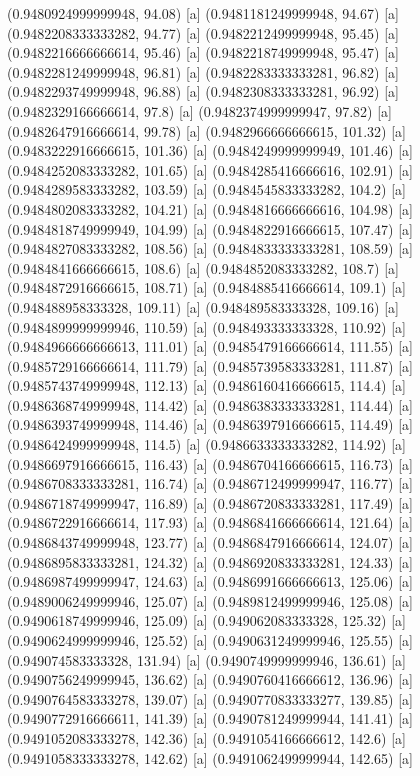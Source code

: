 {{{(0.9480924999999948, 94.08) [a] 
(0.9481181249999948, 94.67) [a] 
(0.9482208333333282, 94.77) [a] 
(0.9482212499999948, 95.45) [a] 
(0.9482216666666614, 95.46) [a] 
(0.9482218749999948, 95.47) [a] 
(0.9482281249999948, 96.81) [a] 
(0.9482283333333281, 96.82) [a] 
(0.9482293749999948, 96.88) [a] 
(0.9482308333333281, 96.92) [a] 
(0.9482329166666614, 97.8) [a] 
(0.9482374999999947, 97.82) [a] 
(0.9482647916666614, 99.78) [a] 
(0.9482966666666615, 101.32) [a] 
(0.9483222916666615, 101.36) [a] 
(0.9484249999999949, 101.46) [a] 
(0.9484252083333282, 101.65) [a] 
(0.9484285416666616, 102.91) [a] 
(0.9484289583333282, 103.59) [a] 
(0.9484545833333282, 104.2) [a] 
(0.9484802083333282, 104.21) [a] 
(0.9484816666666616, 104.98) [a] 
(0.9484818749999949, 104.99) [a] 
(0.9484822916666615, 107.47) [a] 
(0.9484827083333282, 108.56) [a] 
(0.9484833333333281, 108.59) [a] 
(0.9484841666666615, 108.6) [a] 
(0.9484852083333282, 108.7) [a] 
(0.9484872916666615, 108.71) [a] 
(0.9484885416666614, 109.1) [a] 
(0.948488958333328, 109.11) [a] 
(0.948489583333328, 109.16) [a] 
(0.9484899999999946, 110.59) [a] 
(0.948493333333328, 110.92) [a] 
(0.9484966666666613, 111.01) [a] 
(0.9485479166666614, 111.55) [a] 
(0.9485729166666614, 111.79) [a] 
(0.9485739583333281, 111.87) [a] 
(0.9485743749999948, 112.13) [a] 
(0.9486160416666615, 114.4) [a] 
(0.9486368749999948, 114.42) [a] 
(0.9486383333333281, 114.44) [a] 
(0.9486393749999948, 114.46) [a] 
(0.9486397916666615, 114.49) [a] 
(0.9486424999999948, 114.5) [a] 
(0.9486633333333282, 114.92) [a] 
(0.9486697916666615, 116.43) [a] 
(0.9486704166666615, 116.73) [a] 
(0.9486708333333281, 116.74) [a] 
(0.9486712499999947, 116.77) [a] 
(0.9486718749999947, 116.89) [a] 
(0.9486720833333281, 117.49) [a] 
(0.9486722916666614, 117.93) [a] 
(0.9486841666666614, 121.64) [a] 
(0.9486843749999948, 123.77) [a] 
(0.9486847916666614, 124.07) [a] 
(0.9486895833333281, 124.32) [a] 
(0.9486920833333281, 124.33) [a] 
(0.9486987499999947, 124.63) [a] 
(0.9486991666666613, 125.06) [a] 
(0.9489006249999946, 125.07) [a] 
(0.9489812499999946, 125.08) [a] 
(0.9490618749999946, 125.09) [a] 
(0.949062083333328, 125.32) [a] 
(0.9490624999999946, 125.52) [a] 
(0.9490631249999946, 125.55) [a] 
(0.949074583333328, 131.94) [a] 
(0.9490749999999946, 136.61) [a] 
(0.9490756249999945, 136.62) [a] 
(0.9490760416666612, 136.96) [a] 
(0.9490764583333278, 139.07) [a] 
(0.9490770833333277, 139.85) [a] 
(0.9490772916666611, 141.39) [a] 
(0.9490781249999944, 141.41) [a] 
(0.9491052083333278, 142.36) [a] 
(0.9491054166666612, 142.6) [a] 
(0.9491058333333278, 142.62) [a] 
(0.9491062499999944, 142.65) [a] 
}}}
